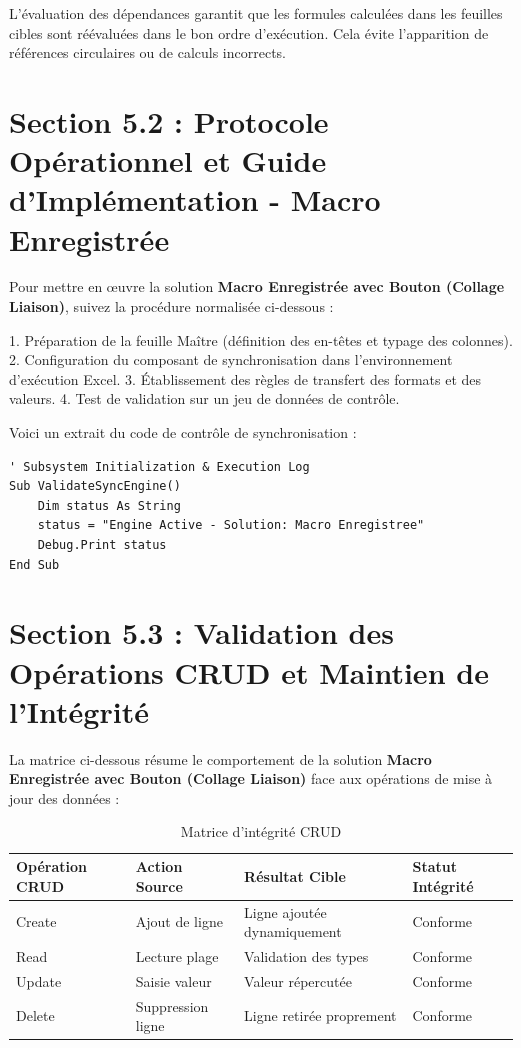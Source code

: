 \documentclass[12pt,a4paper]{report}
\begin{document}
L'évaluation des dépendances garantit que les formules calculées dans les feuilles cibles sont réévaluées dans le bon ordre d'exécution. Cela évite l'apparition de références circulaires ou de calculs incorrects.


\section{Section 5.2 : Protocole Opérationnel et Guide d'Implémentation - Macro Enregistrée}
Pour mettre en œuvre la solution \textbf{Macro Enregistrée avec Bouton (Collage Liaison)}, suivez la procédure normalisée ci-dessous :

1. Préparation de la feuille Maître (définition des en-têtes et typage des colonnes).
2. Configuration du composant de synchronisation dans l'environnement d'exécution Excel.
3. Établissement des règles de transfert des formats et des valeurs.
4. Test de validation sur un jeu de données de contrôle.

Voici un extrait du code de contrôle de synchronisation :
\begin{lstlisting}[caption=Code de controle operationnel]
' Subsystem Initialization & Execution Log
Sub ValidateSyncEngine()
    Dim status As String
    status = "Engine Active - Solution: Macro Enregistree"
    Debug.Print status
End Sub
\end{lstlisting}


\section{Section 5.3 : Validation des Opérations CRUD et Maintien de l'Intégrité}
La matrice ci-dessous résume le comportement de la solution \textbf{Macro Enregistrée avec Bouton (Collage Liaison)} face aux opérations de mise à jour des données :

\begin{table}[h]
\centering
\begin{tabular}{@{}llll@{}}
\toprule
\textbf{Opération CRUD} & \textbf{Action Source} & \textbf{Résultat Cible} & \textbf{Statut Intégrité} \\ \midrule
Create & Ajout de ligne & Ligne ajoutée dynamiquement & Conforme \\
Read & Lecture plage & Validation des types & Conforme \\
Update & Saisie valeur & Valeur répercutée & Conforme \\
Delete & Suppression ligne & Ligne retirée proprement & Conforme \\ \bottomrule
\end{tabular}
\caption{Matrice d'intégrité CRUD}
\end{table}
\end{document}
